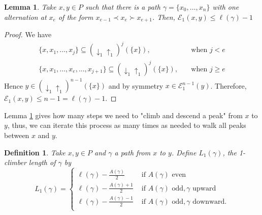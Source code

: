 \documentclass{article}[12pt]
\theoremstyle{exampstyle}
\newtheorem{definition}[theorem]{Definition}
\newtheorem{lemma}[theorem]{Lemma}
\theoremstyle{remark}
\newcommand{\E}{\mathcal{E}}
\newcommand{\updown}[1][]{\downarrow_{#1} \uparrow_{#1}}
\newcommand{\tuple}[3][1]{#2_{#1}, \dots , #2_{#3}}
\begin{document}
\begin{lemma}
    Take $x,y \in P $ such that there is a path $\gamma = \{ \tuple[0]{x}{n}\}$ with one alternation at $x_e$ of the form $x_{e-1} \prec x_e \succ x_{e+1}$. Then, $\E_1(x,y) \leq \ell(\gamma)-1$
    \label{lemma:1-1_one}
\end{lemma}
\begin{proof}
    We have
    \begin{align*}
        \{ x, \tuple[1]{x}{j}\} \subseteq (\updown[1])^{j}(\{x\}), & \quad  \text{when } j < e  \\
         \{ x, \tuple[1]{x}{e}, ..., x_{j+1}\} \subseteq (\updown[1])^{j}(\{x\}), & \quad  \text{when } j \geq e 
    \end{align*}
    Hence $y \in (\updown[1])^{n-1}(\{x\})$ and by symmetry $x \in \E_1^{n-1}(y)$. Therefore, $\E_1(x,y) \leq n- 1 = \ell(\gamma)-1$.
\end{proof}

Lemma \ref{lemma:1-1_one} gives how many steps we need to "climb and descend a peak" from $x$ to $y$, thus, we can iterate this process as many times as needed to walk all peaks between $x$ and $y$.

\begin{definition}
    Take $x,y \in P$ and $\gamma$ a path from $x$ to $y$. Define $L_1(\gamma)$, the \textit{1-climber length} of $\gamma$ by 
    \begin{equation*}
        L_1(\gamma) =  \left\{ 
        \begin{array}{cc}
            \ell(\gamma) - \frac{A(\gamma)}{2} &  \text{ if } A(\gamma) \text{ even}\\
            \ell(\gamma) - \frac{A(\gamma)+1}{2} &  \text{ if } A(\gamma) \text{ odd}, \gamma \text{ upward}\\
            \ell(\gamma) - \frac{A(\gamma)-1}{2} &  \text{ if } A(\gamma) \text{ odd}, \gamma \text{ downward}.\\
        \end{array}
        \right.
    \end{equation*}
\end{definition}
\end{document}
